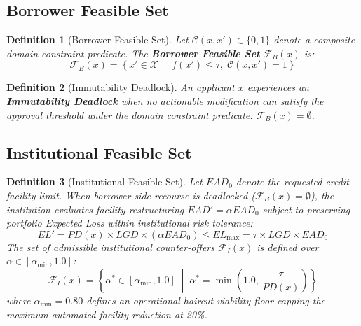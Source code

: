 \documentclass[manuscript,screen,review,anonymous]{acmart}
\newtheorem{definition}{Definition}
\begin{document}
\subsection{Borrower Feasible Set}
\begin{definition}[Borrower Feasible Set]
Let $\mathcal{C}(x, x') \in \{0, 1\}$ denote a composite domain constraint predicate. The \textbf{Borrower Feasible Set} $\mathcal{F}_B(x)$ is:
\begin{equation}
\mathcal{F}_B(x) = \left\{ x' \in \mathcal{X} \;\middle|\; f(x') \le \tau, \; \mathcal{C}(x, x') = 1 \right\}
\label{eq:borrower_feasible_set}
\end{equation}
\end{definition}

\begin{definition}[Immutability Deadlock]
An applicant $x$ experiences an \textbf{Immutability Deadlock} when no actionable modification can satisfy the approval threshold under the domain constraint predicate: $\mathcal{F}_B(x) = \emptyset$.
\end{definition}

\subsection{Institutional Feasible Set}
\begin{definition}[Institutional Feasible Set]
Let $EAD_0$ denote the requested credit facility limit. When borrower-side recourse is deadlocked ($\mathcal{F}_B(x) = \emptyset$), the institution evaluates facility restructuring $EAD' = \alpha EAD_0$ subject to preserving portfolio Expected Loss within institutional risk tolerance:
\begin{equation}
EL' = PD(x) \times LGD \times (\alpha EAD_0) \le EL_{\max} = \tau \times LGD \times EAD_0
\label{eq:institutional_el}
\end{equation}
The set of admissible institutional counter-offers $\mathcal{F}_I(x)$ is defined over $\alpha \in [\alpha_{\min}, 1.0]$:
\begin{equation}
\mathcal{F}_I(x) = \left\{ \alpha^* \in [\alpha_{\min}, 1.0] \;\middle|\; \alpha^* = \min\left(1.0, \, \frac{\tau}{PD(x)}\right) \right\}
\label{eq:institutional_pathway}
\end{equation}
where $\alpha_{\min} = 0.80$ defines an operational haircut viability floor capping the maximum automated facility reduction at 20\%.
\end{definition}
\end{document}
